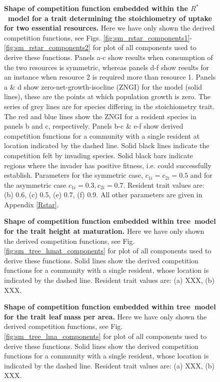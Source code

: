 \documentclass[a4paper,11pt]{article}
\newcommand{\Rstar}{\ensuremath{R^*}}
\newcommand{\TREE}{{\sc tree}}
\begin{document}
\begin{figure}[h]
  \centering
  \caption{\textbf{Shape of competition function embedded within the \Rstar\ model
  for a trait determining the stoichiometry of uptake for two essential resources.}
  Here we have only shown the derived  competition functions, see Figs.
  \ref{fig:sm_rstar_components1}-\ref{fig:sm_rstar_components2} for plot of all
  components used to derive these functions.
  Panels a-c show results when consumption of the two resources is symmetric, whereas
  panels d-f show results for an instance when resource 2 is required more than
  resource 1. Panels a \& d show zero-net-growth-isocline (ZNGI) for
  the  model  (solid lines), these are the points at which population growth is zero.
  The series of grey lines are for species differing in the stoichiometry trait.
  The red and blue lines show the ZNGI for a resident species in panels b and
  c, respectively. Panels b-c \& e-f show derived competition functions for a
  community with a single resident at location indicated by the dashed line.
  Solid black lines indicate the competition felt by invading species. Solid
  black bars indicate regions where the invader has positive fitness, i.e.
  could successfully establish. Parameters for the symmetric case, $c_{1i} =
  c_ {2i}=0.5$ and for the asymmetric case $c_{1i} = 0.3, c_ {2i}=0.7$. Resident
  trait values are: (b) 0.6, (c) 0.5, (e) 0.7, (f) 0.9. All other parameters
  are given in Appendix \ref{Rstar}.
  \label{fig:Rstar}}
\end{figure}

\begin{figure}[h]
  \centering
  \caption{\textbf{Shape of competition function embedded within \TREE\ model for
  the trait height at maturation.}
  Here we have only shown the derived  competition functions, see Fig.
  \ref{fig:sm_tree_hmat_components} for plot of all components used to derive these functions.
  Solid lines show the derived competition functions for a community with a
  single resident, whose location is indicated by the dashed line.
  Resident trait values are: (a) XXX, (b) XXX.
  \label{fig:tree_hmat}}
\end{figure}

\begin{figure}[h]
  \centering
  \caption{\textbf{Shape of competition function embedded within \TREE\ model for
  the trait leaf mass per area.}
  Here we have only shown the derived  competition functions, see Fig.
  \ref{fig:sm_tree_lma_components} for plot of all components used to derive these functions.
  Solid lines show the derived competition functions for a community with a
  single resident, whose location is indicated by the dashed line.
  Resident trait values are: (a) XXX, (b) XXX.
  \label{fig:tree_lma}}
\end{figure}
\end{document}
